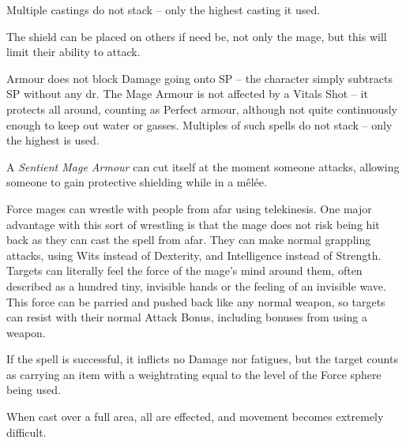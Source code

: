 \begin{multicols}{2}
Multiple castings do not stack -- only the highest casting it used.

The shield can be placed on others if need be, not only the mage, but this will limit their ability to attack.

Armour does not block Damage going onto \gls{SP} -- the character simply subtracts \gls{SP} without any \gls{dr}. The Mage Armour is not affected by a Vitals Shot -- it protects all around, counting as Perfect armour, although not quite continuously enough to keep out water or gasses. Multiples of such spells do not stack -- only the highest is used.

A \textit{Sentient Mage Armour} can cut itself at the moment someone attacks, allowing someone to gain protective shielding while in a mêlée.

\spelllevel


Force mages can wrestle with people from afar using telekinesis.
One major advantage with this sort of wrestling is that the mage does not risk being hit back as they can cast the spell from afar.
They can make normal grappling attacks, using Wits instead of Dexterity, and Intelligence instead of Strength.
Targets can literally feel the force of the mage's mind around them, often described as a hundred tiny, invisible hands or the feeling of an invisible wave.
This force can be parried and pushed back like any normal weapon, so targets can resist with their normal Attack Bonus, including bonuses from using a weapon.

If the spell is successful, it inflicts no Damage nor \glspl{fatigue}, but the target counts as carrying an item with a \gls{weightrating} equal to the level of the Force sphere being used.

When cast over a full area, all are effected, and movement becomes extremely difficult.

\end{multicols}


